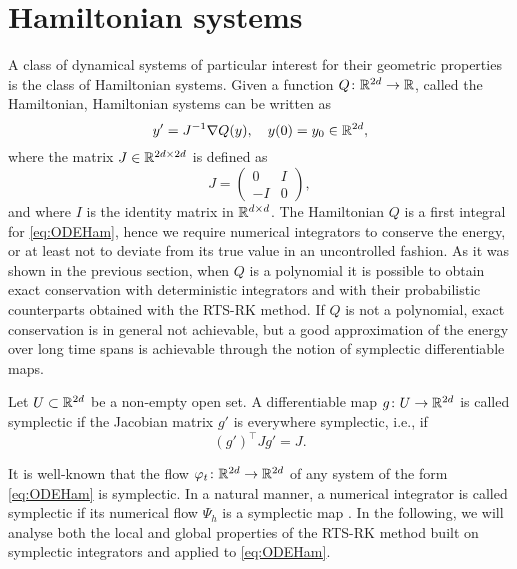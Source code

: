 \documentclass[10pt]{article}
\begin{document}
\section{Hamiltonian systems}\label{sec:Hamiltonian} A class of dynamical systems of particular interest for their geometric properties is the class of Hamiltonian systems. Given a function $Q \colon \mathbb{R}^{2d} \to \mathbb{R}$, called the Hamiltonian, Hamiltonian systems can be written as
\begin{equation}\label{eq:ODEHam}
y' = J^{-1}\nabla Q(y), \quad y(0) = y_0 \in \mathbb{R}^{2d},
\end{equation}
where the matrix $J\in\mathbb{R}^{2d \times 2d}$ is defined as
\begin{equation}
J = \begin{pmatrix} 0 & I \\ -I & 0 \end{pmatrix},
\end{equation}
and where $I$ is the identity matrix in $\mathbb{R}^{d\times d}$. The Hamiltonian $Q$ is a first integral for \eqref{eq:ODEHam}, hence we require numerical integrators to conserve the energy, or at least not to deviate from its true value in an uncontrolled fashion. As it was shown in the previous section, when $Q$ is a polynomial it is possible to obtain exact conservation with deterministic integrators and with their probabilistic counterparts obtained with the RTS-RK method. If $Q$ is not a polynomial, exact conservation is in general not achievable, but a good approximation of the energy over long time spans is achievable through the notion of symplectic differentiable maps.

\begin{definition} Let $U\subset \mathbb{R}^{2d}$ be a non-empty open set. A differentiable map $g\colon U \to \mathbb{R}^{2d}$ is called symplectic if the Jacobian matrix $g'$ is everywhere symplectic, i.e., if
	\begin{equation}\label{eq:SymplecticMap}
	(g')^\top J g' = J.
	\end{equation}	
\end{definition}
It is well-known that the flow $\varphi_t\colon\mathbb{R}^{2d}\to\mathbb{R}^{2d}$ of any system of the form \eqref{eq:ODEHam} is symplectic. In a natural manner, a numerical integrator is called symplectic if its numerical flow $\Psi_h$ is a symplectic map . In the following, we will analyse both the local and global properties of the RTS-RK method built on symplectic integrators and applied to \eqref{eq:ODEHam}.
\end{document}
